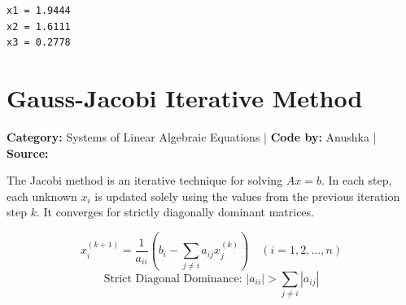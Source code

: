 \documentclass[10pt,a4paper]{report}
\begin{document}
\begin{tcolorbox}[colback=termbg,colframe=primary,title=\textbf{Program Execution Output \& Convergence Table},boxrule=1pt,arc=2mm]
\begin{lstlisting}[style=terminal_output]
x1 = 1.9444
x2 = 1.6111
x3 = 0.2778
\end{lstlisting}
\end{tcolorbox}

\newpage

\section{Gauss-Jacobi Iterative Method}
\textbf{Category:} \textcolor{secondary}{Systems of Linear Algebraic Equations} \quad | \quad \textbf{Code by:} \textcolor{secondary}{Anushka} \quad | \quad \textbf{Source:} \texttt{}

The Jacobi method is an iterative technique for solving $A x = b$. In each step, each unknown $x_i$ is updated solely using the values from the previous iteration step $k$. It converges for strictly diagonally dominant matrices.

\begin{tcolorbox}[colback=theorybg,colframe=theoryframe,title=\textbf{Mathematical Theory \& Formulation},boxrule=1pt,arc=2mm]
\[
x_i^{(k+1)} = \frac{1}{a_{ii}}\left(b_i - \sum_{j \neq i} a_{ij} x_j^{(k)}\right) \quad (i = 1, 2, \dots, n)
\]
\[
\text{Strict Diagonal Dominance: } |a_{ii}| > \sum_{j \neq i} |a_{ij}|
\]
\end{tcolorbox}
\end{document}

